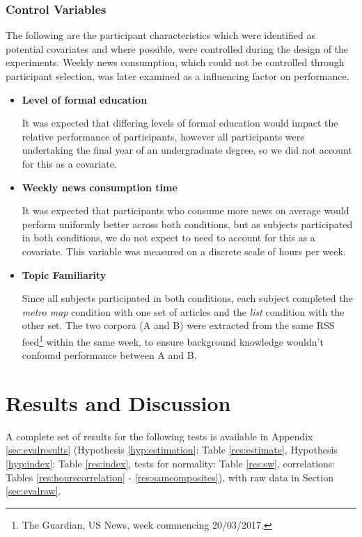 \subsubsection{Control Variables}
The following are the participant characteristics which were identified as potential covariates and where possible, were controlled during the design of the experiments. Weekly news consumption, which could not be controlled through participant selection, was later examined as a influencing factor on performance.

\begin{itemize}
	\item\textbf{Level of formal education} \par
		It was expected that differing levels of formal education would impact the relative performance of participants, however all participants were undertaking the final year of an undergraduate degree, so we did not account for this as a covariate.
	\item\textbf{Weekly news consumption time} \par
		It was expected that participants who consume more news on average would perform uniformly better across both conditions, but as subjects participated in both conditions, we do not expect to need to account for this as a covariate. This variable was measured on a discrete scale of hours per week.
	\item\textbf{Topic Familiarity} \par
		Since all subjects participated in both conditions, each subject completed the \textit{metro map} condition with one set of articles and the \textit{list} condition with the other set. The two corpora (A and B) were extracted from the same RSS feed\footnote{The Guardian, US News, week commencing 20/03/2017.} within the same week, to ensure background knowledge wouldn't confound performance between A and B.
\end{itemize}

\section{Results and Discussion}

A complete set of results for the following tests is available in Appendix \ref{sec:evalresults} (Hypothesis \ref{hyp:estimation}: Table \ref{res:estimate}, Hypothesis \ref{hyp:index}: Table \ref{res:index}, tests for normality: Table \ref{res:sw}, correlations: Tables \ref{res:hourscorrelation} -  \ref{res:samcomposites}), with raw data in Section \ref{sec:evalraw}.

